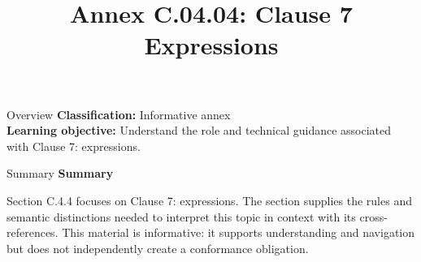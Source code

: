 \documentclass[10pt,letterpaper]{article}
\title{Annex C.04.04: Clause 7 Expressions}
\author{}
\date{}
\begin{document}
\maketitle
\begin{CornellOverviewBox}{Overview}
\textbf{Classification:} Informative annex\\[2pt]
\textbf{Learning objective:} Understand the role and technical guidance associated with Clause 7: expressions.
\end{CornellOverviewBox}\begin{CornellSummaryBox}{Summary}
{\sffamily\bfseries\color{Accent} Summary}\par\vspace{3pt}Section C.4.4 focuses on Clause 7: expressions. The section supplies the rules and semantic distinctions needed to interpret this topic in context with its cross-references. This material is informative: it supports understanding and navigation but does not independently create a conformance obligation.
\end{CornellSummaryBox}
\end{document}
